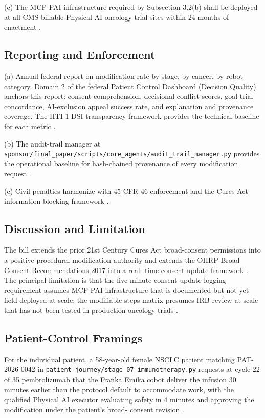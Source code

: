 (c) The MCP-PAI infrastructure required by Subsection 3.2(b) shall
be deployed at all CMS-billable Physical AI oncology trial sites
within 24 months of enactment \cite{kawchak_2026_19244918}.

\subsection{Reporting and Enforcement}

(a) Annual federal report on modification rate by stage, by cancer,
by robot category. Domain 2 of the federal Patient Control Dashboard
(Decision Quality) anchors this report: consent comprehension,
decisional-conflict scores, goal-trial concordance, AI-exclusion
appeal success rate, and explanation and provenance coverage. The
HTI-1 DSI transparency framework provides the technical baseline for
each metric \cite{hti1_dsi_fact_sheet_2023}.

(b) The audit-trail manager at
\texttt{sponsor/final\_paper/scripts/core\_agents/audit\_trail\_manager.py}
provides the operational baseline for hash-chained provenance of
every modification request \cite{kawchak_2026_19396256}.

(c) Civil penalties harmonize with 45 CFR 46 enforcement and the
Cures Act information-blocking framework
\cite{federal_register_info_blocking_disincentives_2024}.

\subsection{Discussion and Limitation}

The bill extends the prior 21st Century Cures Act broad-consent
permissions into a positive procedural modification authority and
extends the OHRP Broad Consent Recommendations 2017 into a real-
time consent update framework \cite{rank1_cures_act_2016,
onc_cures_act_final_rule_page, ohrp_broad_consent_attachment_c_2017}.
The principal limitation is that the five-minute consent-update
logging requirement assumes MCP-PAI infrastructure that is documented
but not yet field-deployed at scale; the modifiable-steps matrix
presumes IRB review at scale that has not been tested in production
oncology trials \cite{kawchak_2026_18973368}.

\subsection{Patient-Control Framings}

For the individual patient, a 58-year-old female NSCLC patient
matching PAT-2026-0042 in
\texttt{patient-journey/stage\_07\_immunotherapy.py} requests at
cycle 22 of 35 pembrolizumab that the Franka Emika cobot deliver the
infusion 30 minutes earlier than the protocol default to accommodate
work, with the qualified Physical AI executor evaluating safety in
4 minutes and approving the modification under the patient's broad-
consent revision \cite{kawchak_2026_19119939, kawchak_2026_18778219}.

